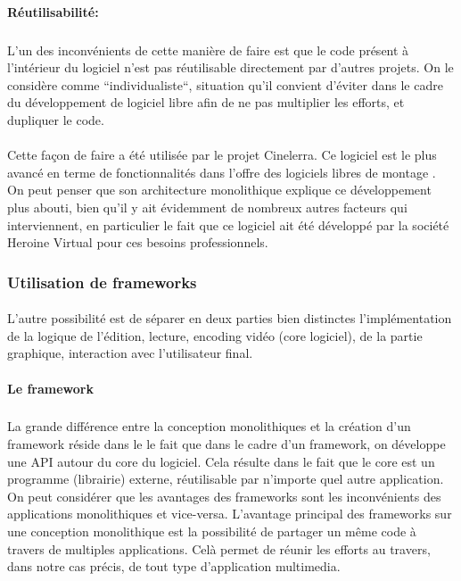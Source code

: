 \paragraph{Réutilisabilité:}

\subparagraph { }

L'un des inconvénients de cette manière de faire est que le code
présent
 à l'intérieur du logiciel n'est pas réutilisable directement
par d'autres projets. On le considère comme ``individualiste``, situation
qu'il convient d'éviter dans le cadre du développement de logiciel
libre afin de ne pas multiplier les efforts, et dupliquer le code.

\paragraph{}

Cette façon de faire a été utilisée par le projet Cinelerra. Ce
logiciel est le plus avancé en terme de fonctionnalités dans l'offre
des logiciels libres de montage . On peut penser que son architecture
monolithique explique ce développement plus
abouti, bien qu'il y ait évidemment de nombreux autres facteurs
qui interviennent, en particulier le fait que ce logiciel ait
été développé par la société Heroine Virtual pour ces besoins
professionnels.

\subsubsection {Utilisation de  frameworks }

\paragraph{}

L'autre possibilité est de séparer en deux parties bien distinctes
l'implémentation de la logique de l'édition, lecture, encoding vidéo
(core logiciel), de la partie graphique, interaction avec l'utilisateur
final.

\paragraph {Le framework}

\subparagraph{}

La grande différence entre la conception monolithiques
 et la création d'un framework 
réside dans le le fait que dans le cadre d'un framework, on développe
une API  autour du core du logiciel. Cela résulte dans le
fait que le core est un programme (librairie) externe, réutilisable par
n'importe quel autre application.  On peut considérer que les avantages
des frameworks sont les inconvénients des applications monolithiques
 et vice-versa. L'avantage principal des frameworks
sur une conception monolithique est la possibilité
de partager un même code à travers de multiples applications. Celà
permet de réunir les efforts au travers, dans notre cas précis, de
tout type d'application multimedia.

